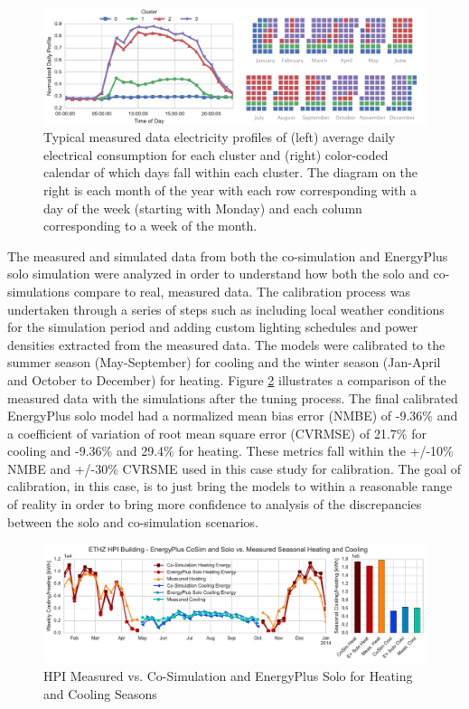 \documentclass{tBPS2e}
\theoremstyle{plain}
\theoremstyle{definition}
\theoremstyle{remark}
\begin{document}
\begin{figure}[H]
\centering
\includegraphics[scale=0.55]{figures/HPI_combinedclusterandcal_5}
\caption{Typical measured data electricity profiles of (left) average daily electrical consumption for each cluster and (right)
color-coded calendar of which days fall within each cluster. The diagram on the right is each month of the year with each row corresponding with
a day of the week (starting with Monday) and each column corresponding to a week of the month.}
\label{fig:hpi_elec_profiles}
\end{figure}

The measured and simulated data from both the co-simulation and EnergyPlus
solo simulation were analyzed in order to understand how both the solo and co-simulations 
compare to real, measured data. The calibration process was undertaken through a series of steps
such as including local weather conditions for the simulation period and
adding custom lighting schedules and power densities extracted from the
measured data. The models were calibrated to the summer season (May-September)
for cooling and the winter season (Jan-April and October to December) for
heating. Figure \ref{fig:hpi_measvssim} illustrates a comparison of the measured data with the
simulations after the tuning process. The final calibrated EnergyPlus solo
model had a normalized mean bias error (NMBE) of -9.36\% and a coefficient of
variation of root mean square error (CVRMSE) of 21.7\% for cooling and -9.36\%
and 29.4\% for heating. These metrics fall within the +/-10\% NMBE and +/-30\%
CVRSME used in this case study for calibration. The
goal of calibration, in this case, is to just bring the models to within a
reasonable range of reality in order to bring more confidence to analysis of
the discrepancies between the solo and co-simulation
scenarios.


\begin{figure}[H]
\centering
\includegraphics[scale=0.55]{figures/HPI_MeasvsSim}
\caption{HPI Measured vs. Co-Simulation and EnergyPlus Solo for Heating and Cooling Seasons}
\label{fig:hpi_measvssim}
\end{figure}
\end{document}
